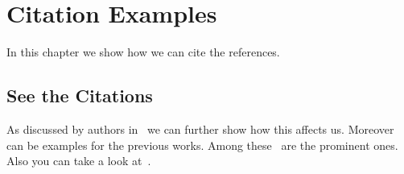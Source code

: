 \chapter{Citation Examples}\label{ch:citations}

In this chapter we show how we can cite the references.


\section{See the Citations}
\label{sec:cite}

As discussed by authors 
in~\cite{das2007survey,nicolae2014efficient,nicolae2015qpms9} we can
further show how this affects
us. Moreover~\cite{tanaka2014improved,gohardaninew,huan2015efficient}
can be examples for the previous works. Among
these~\cite{aickelin2005artificial,faruque2016modelling,durocher2015graphs,rahman2016absent,hashem2013countering,farhad2016mapping,dinh2012qpms7}
are the prominent ones. Also you can take a look
at~\cite{jones2004introduction,xiao2016qpms10}.


\endinput



